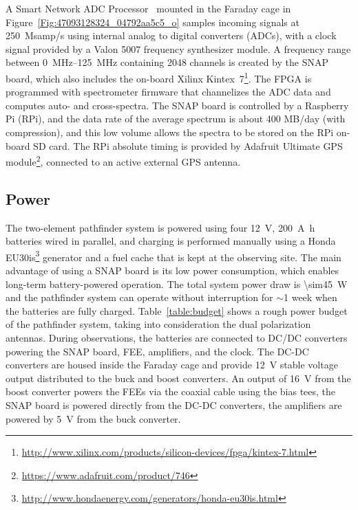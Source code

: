 A Smart Network ADC Processor~\citep[SNAP;][]{2016JAI.....541001H} mounted in the Faraday cage in Figure~\ref{Fig:47093128324_04792aa5c5_o} samples incoming signals at \SI{250}{Msamp/s} using internal analog to digital converters (ADCs), with a clock signal provided by a Valon 5007 frequency synthesizer module. A frequency range between \SIrange{0}{125}{\mega\hertz} containing 2048 channels is created by the SNAP board, which also includes the on-board Xilinx Kintex~7\footnote{\url{http://www.xilinx.com/products/silicon-devices/fpga/kintex-7.html}}. The FPGA is programmed with spectrometer firmware that channelizes the ADC data and computes auto- and cross-spectra. The SNAP board is controlled by a Raspberry Pi (RPi), and the data rate of the average spectrum is about 400 MB/day (with compression), and this low volume allows the spectra to be stored on the RPi on-board SD card. The RPi absolute timing is provided by Adafruit Ultimate GPS module\footnote{\url{https://www.adafruit.com/product/746}}, connected to an active external GPS antenna.

\subsection{Power}
The two-element pathfinder system is powered using four \SI{12}{\volt}, \SI{200}{\ampere\hour} batteries wired in parallel, and charging is performed manually using a Honda EU30is\footnote {\url{http://www.hondaenergy.com/generators/honda-eu30is.html}} generator and a fuel cache that is kept at the observing site. The main advantage of using a SNAP board is its low power consumption, which enables long-term battery-powered operation. The total system power draw is \SI{\sim45}{\watt} and the pathfinder system can operate without interruption for $\sim$1 week when the batteries are fully charged. Table~\ref{table:budget} shows a rough power budget of the pathfinder system, taking into consideration the dual polarization antennas. During observations, the batteries are connected to DC/DC converters powering the SNAP board, FEE, amplifiers, and the clock. The DC-DC converters are housed inside the Faraday cage and provide \SI{12}{\volt} stable voltage output distributed to the buck and boost converters. An output of \SI{16}{\volt} from the boost converter powers the FEEs via the coaxial cable using the bias tees, the SNAP board is powered directly from the DC-DC converters, the amplifiers are powered by \SI{5}{\volt} from the buck converter.

